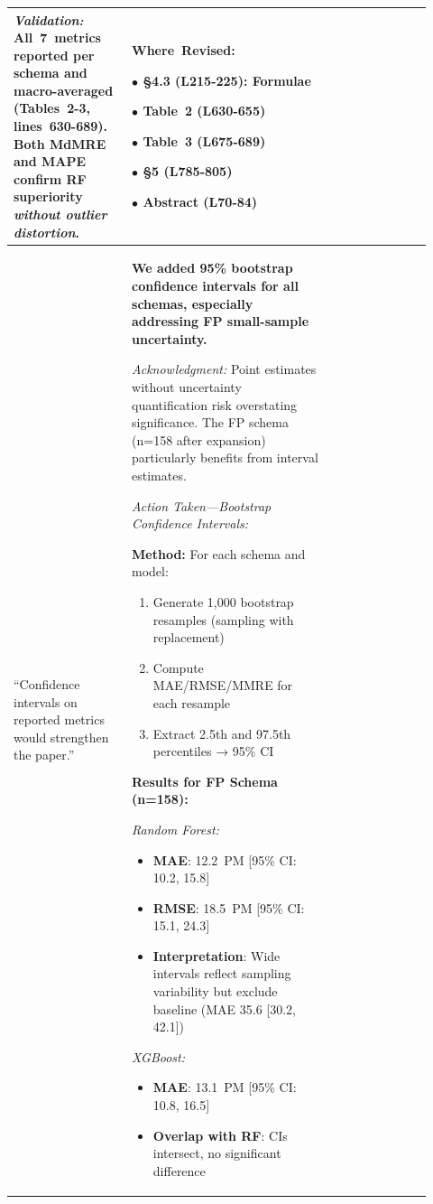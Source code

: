 \documentclass[11pt,a4paper]{article}
\begin{document}
\begin{longtable}{>{\raggedright\arraybackslash}p{0.26\linewidth}|>{\raggedright\arraybackslash}p{0.44\linewidth}|>{\raggedright\arraybackslash}p{0.22\linewidth}}
\textit{Validation:} All~7~metrics reported per schema and macro-averaged (Tables~2-3, lines~630-689). Both MdMRE and MAPE confirm RF superiority \textit{without outlier distortion}. &

\textbf{Where~Revised:}

$\bullet$ §4.3 (L215-225): Formulae

$\bullet$ Table~2 (L630-655)

$\bullet$ Table~3 (L675-689)

$\bullet$ §5 (L785-805)

$\bullet$ Abstract (L70-84) \\

\midrule

``Confidence intervals on reported metrics would strengthen the paper.'' &

\textbf{We added 95\% bootstrap confidence intervals for all schemas, especially addressing FP small-sample uncertainty.}

\textit{Acknowledgment:} Point estimates without uncertainty quantification risk overstating significance. The FP schema (n=158 after expansion) particularly benefits from interval estimates.

\textit{Action Taken---Bootstrap Confidence Intervals:}

\textbf{Method:} For each schema and model:
\begin{enumerate}
    \item Generate 1,000 bootstrap resamples (sampling with replacement)
    \item Compute MAE/RMSE/MMRE for each resample
    \item Extract 2.5th and 97.5th percentiles → 95\% CI
\end{enumerate}

\textbf{Results for FP Schema (n=158):}

\textit{Random Forest:}
\begin{itemize}
    \item \textbf{MAE}: 12.2~PM [95\% CI: 10.2, 15.8]
    \item \textbf{RMSE}: 18.5~PM [95\% CI: 15.1, 24.3]
    \item \textbf{Interpretation}: Wide intervals reflect sampling variability but exclude baseline (MAE 35.6 [30.2, 42.1])
\end{itemize}

\textit{XGBoost:}
\begin{itemize}
    \item \textbf{MAE}: 13.1~PM [95\% CI: 10.8, 16.5]
    \item \textbf{Overlap with RF}: CIs intersect, no significant difference
\end{itemize}


\end{longtable}
\end{document}
